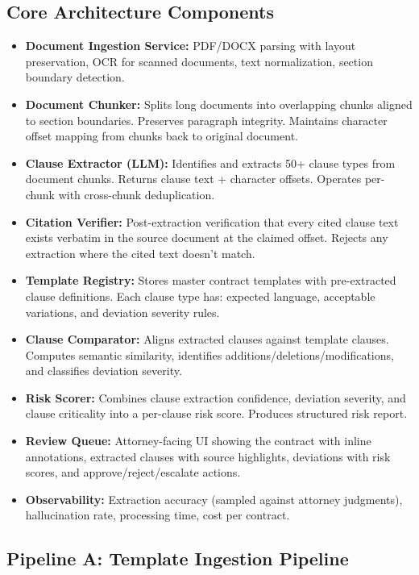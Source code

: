 \subsection*{Core Architecture Components}

\begin{itemize}
  \item \textbf{Document Ingestion Service:} PDF/DOCX parsing with layout preservation, OCR for scanned documents, text normalization, section boundary detection.
  \item \textbf{Document Chunker:} Splits long documents into overlapping chunks aligned to section boundaries. Preserves paragraph integrity. Maintains character offset mapping from chunks back to original document.
  \item \textbf{Clause Extractor (LLM):} Identifies and extracts 50+ clause types from document chunks. Returns clause text + character offsets. Operates per-chunk with cross-chunk deduplication.
  \item \textbf{Citation Verifier:} Post-extraction verification that every cited clause text exists verbatim in the source document at the claimed offset. Rejects any extraction where the cited text doesn't match.
  \item \textbf{Template Registry:} Stores master contract templates with pre-extracted clause definitions. Each clause type has: expected language, acceptable variations, and deviation severity rules.
  \item \textbf{Clause Comparator:} Aligns extracted clauses against template clauses. Computes semantic similarity, identifies additions/deletions/modifications, and classifies deviation severity.
  \item \textbf{Risk Scorer:} Combines clause extraction confidence, deviation severity, and clause criticality into a per-clause risk score. Produces structured risk report.
  \item \textbf{Review Queue:} Attorney-facing UI showing the contract with inline annotations, extracted clauses with source highlights, deviations with risk scores, and approve/reject/escalate actions.
  \item \textbf{Observability:} Extraction accuracy (sampled against attorney judgments), hallucination rate, processing time, cost per contract.
\end{itemize}

\subsection*{Pipeline A: Template Ingestion Pipeline}

